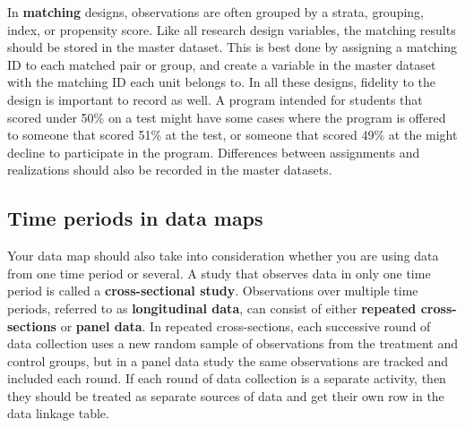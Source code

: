 In \textbf{matching} designs, observations are often grouped
by a strata, grouping, index, or propensity score.
Like all research design variables, the matching results
should be stored in the master dataset.
This is best done by assigning a matching ID
to each matched pair or group,
and create a variable in the master dataset
with the matching ID each unit belongs to.
In all these designs, fidelity to the design is important to record as well.
A program intended for students that scored under 50\% on a test
might have some cases where the program is offered to someone that scored 51\% at the test,
or someone that scored 49\% at the might decline to participate in the program.
Differences between assignments and realizations
should also be recorded in the master datasets.

\subsection{Time periods in data maps}

Your data map should also take into consideration
whether you are using data from one time period or several.
A study that observes data in only one time period is called
a \textbf{cross-sectional study}.
Observations over multiple time periods,
referred to as \textbf{longitudinal data},
can consist of either
\textbf{repeated cross-sections}
or \textbf{panel data}.
In repeated cross-sections,
each successive round of data collection uses a new random sample
of observations from the treatment and control groups,
but in a panel data study
the same observations are tracked and included each round.
If each round of data collection is a separate activity,
then they should be treated as separate sources of data
and get their own row in the data linkage table.

